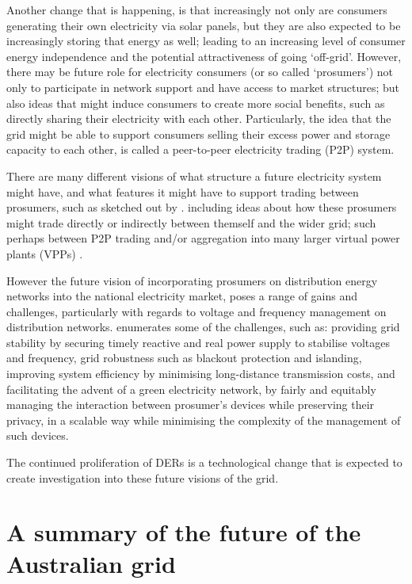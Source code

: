 Another change that is happening, is that increasingly not only are consumers generating their own electricity via solar panels, but they are also expected to be increasingly storing that energy as well; leading to an increasing level of consumer energy independence and the potential attractiveness of going `off-grid'.
However, there may be future role for electricity consumers (or so called `prosumers') not only to participate in network support and have access to market structures; but also ideas that might induce consumers to create more social benefits, such as directly sharing their electricity with each other.
Particularly, the idea that the grid might be able to support consumers selling their excess power and storage capacity to each other, is called a peer-to-peer electricity trading (P2P) system.

There are many different visions of what structure a future electricity system might have, and what features it might have to support trading between prosumers, such as sketched out by \cite{Parag2016}.
including ideas about how these prosumers might trade directly or indirectly between themself and the wider grid; such perhaps between P2P trading and/or aggregation into many larger virtual power plants (VPPs) \cite{Morstyn2018}.

However the future vision of incorporating prosumers on distribution energy networks into the national electricity market, poses a range of gains and challenges, particularly with regards to voltage and frequency management on distribution networks.
\cite{BELL2018765} enumerates some of the challenges, such as: providing grid stability by securing timely reactive and real power supply to stabilise voltages and frequency, grid robustness such as blackout protection and islanding, improving system efficiency by minimising long-distance transmission costs, and facilitating the advent of a green electricity network, by fairly and equitably managing the interaction between prosumer's devices while preserving their privacy, in a scalable way while minimising the complexity of the management of such devices.

The continued proliferation of DERs is a technological change that is expected to create investigation into these future visions of the grid.

\section{A summary of the future of the Australian grid}

